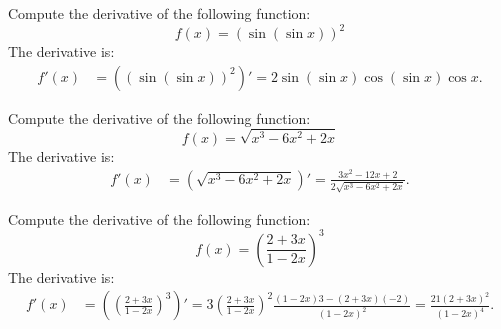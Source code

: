 \cleardoublepage\documentclass[../main.tex]{subfiles}
\begin{document}
\begin{exercise}
Compute the derivative of the following function:
\begin{equation*}
f(x)=(\sin(\sin x))^2
\end{equation*}
\tcblower
The derivative is:
\begin{align*}
f'(x) &= \left( (\sin(\sin x))^2 \right)'
=2\sin(\sin x)\cos(\sin x)\cos x.
\end{align*}
\end{exercise}
\begin{exercise}
Compute the derivative of the following function:
\begin{equation*}
f(x)=\sqrt{x^3-6x^2+2x}
\end{equation*}
\tcblower
The derivative is:
\begin{align*}
f'(x) &= \left( \sqrt{x^3-6x^2+2x} \right)'
= \frac{3x^2-12x+2}{2\sqrt{x^3-6x^2+2x}}.
\end{align*}
\end{exercise}
\begin{exercise}
Compute the derivative of the following function:
\begin{equation*}
f(x)=\left(\frac{2+3x}{1-2x}\right)^3
\end{equation*}
\tcblower
The derivative is:
\begin{align*}
f'(x) &= \left( \left(\frac{2+3x}{1-2x}\right)^3 \right)'
= 3 \left(\frac{2+3x}{1-2x}\right)^2 \frac{(1-2x)3-(2+3x)(-2)}{(1-2x)^2}
= \frac{21(2+3x)^2}{(1-2x)^4}.
\end{align*}
\end{exercise}
\end{document}
